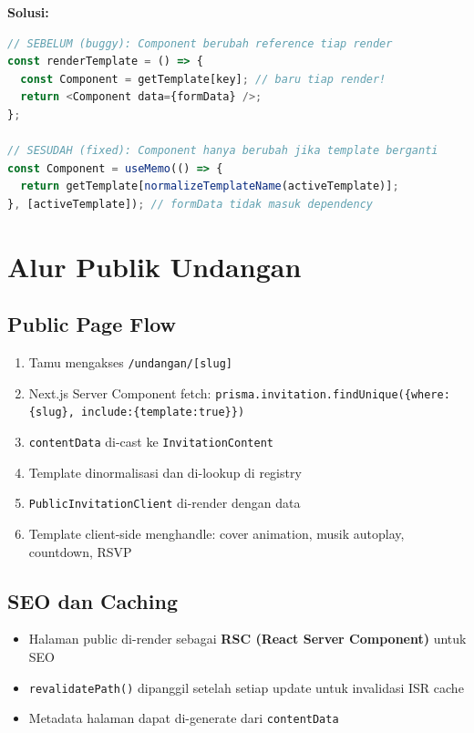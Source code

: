\documentclass[12pt,a4paper]{article}
\begin{document}
\textbf{Solusi:}

\begin{lstlisting}[language=typescript, caption=Fix useMemo di LivePreview]
// SEBELUM (buggy): Component berubah reference tiap render
const renderTemplate = () => {
  const Component = getTemplate[key]; // baru tiap render!
  return <Component data={formData} />;
};

// SESUDAH (fixed): Component hanya berubah jika template berganti
const Component = useMemo(() => {
  return getTemplate[normalizeTemplateName(activeTemplate)];
}, [activeTemplate]); // formData tidak masuk dependency
\end{lstlisting}

\section{Alur Publik Undangan}

\subsection{Public Page Flow}

\begin{enumerate}
  \item Tamu mengakses \texttt{/undangan/[slug]}
  \item Next.js Server Component fetch: \texttt{prisma.invitation.findUnique(\{where:\{slug\}, include:\{template:true\}\})}
  \item \texttt{contentData} di-cast ke \texttt{InvitationContent}
  \item Template dinormalisasi dan di-lookup di registry
  \item \texttt{PublicInvitationClient} di-render dengan data
  \item Template client-side menghandle: cover animation, musik autoplay, countdown, RSVP
\end{enumerate}

\subsection{SEO dan Caching}

\begin{itemize}
  \item Halaman public di-render sebagai \textbf{RSC (React Server Component)} untuk SEO
  \item \texttt{revalidatePath()} dipanggil setelah setiap update untuk invalidasi ISR cache
  \item Metadata halaman dapat di-generate dari \texttt{contentData}
\end{itemize}
\end{document}
